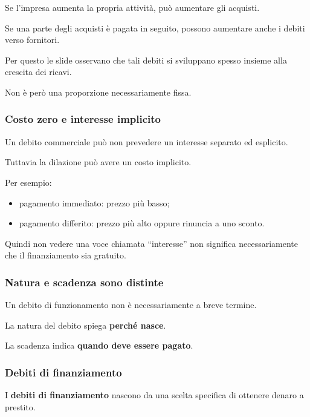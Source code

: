 \noindent Se l'impresa aumenta
la propria attività,
può aumentare gli acquisti.

\noindent Se una parte degli acquisti
è pagata in seguito,
possono aumentare anche
i debiti verso fornitori.

\noindent Per questo le slide osservano
che tali debiti si sviluppano spesso
insieme alla crescita dei ricavi.

\noindent Non è però una proporzione
necessariamente fissa.


\subsubsection*{Costo zero e interesse implicito}

\noindent Un debito commerciale
può non prevedere
un interesse separato ed esplicito.

\noindent Tuttavia la dilazione
può avere un costo implicito.

\noindent Per esempio:

\begin{itemize}
    \item pagamento immediato:
    prezzo più basso;

    \item pagamento differito:
    prezzo più alto
    oppure rinuncia a uno sconto.
\end{itemize}

\noindent Quindi non vedere
una voce chiamata ``interesse''
non significa necessariamente
che il finanziamento sia gratuito.


\subsubsection*{Natura e scadenza sono distinte}

\noindent Un debito di funzionamento
non è necessariamente a breve termine.

\noindent La natura del debito
spiega \textbf{perché nasce}.

\noindent La scadenza indica
\textbf{quando deve essere pagato}.


\subsubsection*{Debiti di finanziamento}

\noindent I \textbf{debiti di finanziamento}
nascono da una scelta specifica
di ottenere denaro a prestito.


